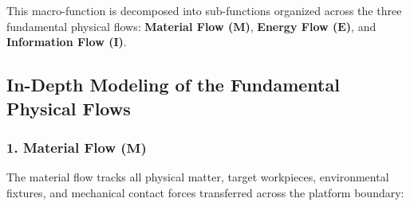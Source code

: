 This macro-function is decomposed into sub-functions organized across the three fundamental physical flows: \textbf{Material Flow ($\mathbf{M}$)}, \textbf{Energy Flow ($\mathbf{E}$)}, and \textbf{Information Flow ($\mathbf{I}$)}.

\subsection{In-Depth Modeling of the Fundamental Physical Flows}

\subsubsection{1. Material Flow \texorpdfstring{($\mathbf{M}$)}{(M)}}
The material flow tracks all physical matter, target workpieces, environmental fixtures, and mechanical contact forces transferred across the platform boundary:
